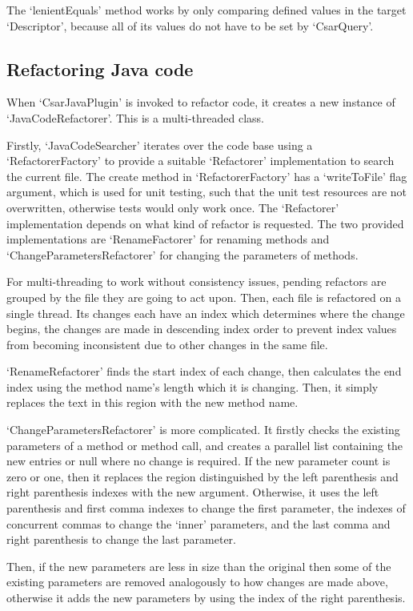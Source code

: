 \documentclass[12pt, letterpaper]{article}
\begin{document}
The `lenientEquals' method works by only comparing defined values in the target `Descriptor', because all of its values do not have to be set by `CsarQuery'.

\subsection{Refactoring Java code}
When `CsarJavaPlugin' is invoked to refactor code, it creates a new instance of `JavaCodeRefactorer'.
This is a multi-threaded class.

Firstly, `JavaCodeSearcher' iterates over the code base using a `RefactorerFactory' to provide a suitable `Refactorer' implementation to search the current file.
The create method in `RefactorerFactory' has a `writeToFile' flag argument, which is used for unit testing, such that the unit test resources are not overwritten, otherwise tests would only work once.
The `Refactorer' implementation depends on what kind of refactor is requested.
The two provided implementations are `RenameFactorer' for renaming methods and `ChangeParametersRefactorer' for changing the parameters of methods.

For multi-threading to work without consistency issues, pending refactors are grouped by the file they are going to act upon.
Then, each file is refactored on a single thread.
Its changes each have an index which determines where the change begins, the changes are made in descending index order to prevent index values from becoming inconsistent due to other changes in the same file.

`RenameRefactorer' finds the start index of each change, then calculates the end index using the method name's length which it is changing.
Then, it simply replaces the text in this region with the new method name.

`ChangeParametersRefactorer' is more complicated.
It firstly checks the existing parameters of a method or method call, and creates a parallel list containing the new entries or null where no change is required.
If the new parameter count is zero or one, then it replaces the region distinguished by the left parenthesis and right parenthesis indexes with the new argument.
Otherwise, it uses the left parenthesis and first comma indexes to change the first parameter, the indexes of concurrent commas to change the `inner' parameters, and the last comma and right parenthesis to change the last parameter.

Then, if the new parameters are less in size than the original then some of the existing parameters are removed analogously to how changes are made above, otherwise it adds the new parameters by using the index of the right parenthesis.
\end{document}
